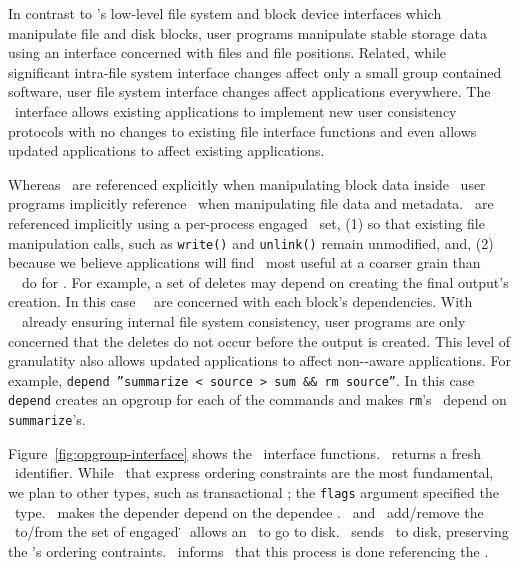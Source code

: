 In contrast to \Kudos{}'s low-level file system and block device
interfaces which manipulate file and disk blocks, user programs
manipulate stable storage data using an interface concerned with files
and file positions.
%
Related, while significant intra-file system interface changes affect
only a small group contained software, user file system interface
changes affect applications everywhere. The \opgroup\ interface allows
existing applications to implement new user consistency protocols
with no changes to existing file interface functions and even allows
updated applications to affect existing applications.

Whereas \chdescs\ are referenced explicitly when manipulating block
data inside \Kudos\, user programs implicitly reference \opgroups\
when manipulating file data and metadata. \Opgroups\ are referenced
implicitly using a per-process engaged \opgroup\ set,
%
(1) so that existing file manipulation calls, such as \verb+write()+
and \verb+unlink()+ remain unmodified, and,
%
(2) because we believe applications will find \opgroups\ most useful
at a coarser grain than \Kudos\ \modules\ do for \chdescs. For
example, a set of deletes may depend on creating the final output's
creation. In this case \Kudos\ \modules\ are concerned with each
block's dependencies. With \Kudos\ \modules\ already ensuring internal
file system consistency, user programs are only concerned that the
deletes do not occur before the output is created. This level of
granulatity also allows updated applications to affect
non-\opgroup{}-aware applications. For example,
\texttt{depend ''summarize < source > sum \&\& rm source''}. In this case
\texttt{depend} creates an opgroup for each of the commands and makes
\texttt{rm}'s \opgroup\ depend on \texttt{summarize}'s.

Figure~\ref{fig:opgroup-interface} shows the \opgroup\ interface functions.
\opgroupCreate\ returns a fresh \opgroup\ identifier. While
\opgroups\ that express ordering constraints are the most fundamental,
we plan to other types, such as transactional \opgroups; the
\texttt{flags} argument specified the \opgroup\ type.
\opgroupAddDepend\ makes the depender depend on the dependee \opgroup.
\opgroupEngage\ and \opgroupDisengage\ add/remove the \opgroup\ to/from
the set of engaged \opgroups\. \opgroupRelease\ allows an \opgroup\ to go
to disk. \opgroupSync\ sends \anopgroup\ to disk, preserving
the \opgroup{}'s ordering contraints. \opgroupAbandon\ informs \Kudos\
that this process is done referencing the \opgroup.


